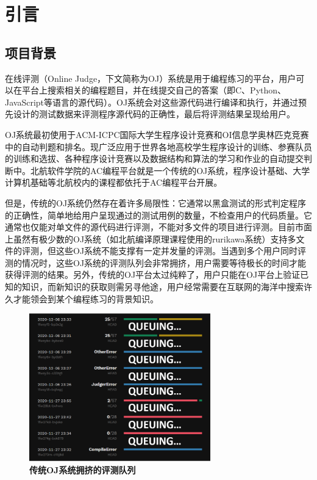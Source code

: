 \chapter{引言}

\section{项目背景}
在线评测（Online Judge，下文简称为OJ）系统是用于编程练习的平台，用户可以在平台上搜索相关的编程题目，并在线提交自己的答案（即C、Python、JavaScript等语言的源代码）。OJ系统会对这些源代码进行编译和执行，并通过预先设计的测试数据来评测程序源代码的正确性，最后将评测结果呈现给用户。

OJ系统最初使用于ACM-ICPC国际大学生程序设计竞赛和OI信息学奥林匹克竞赛中的自动判题和排名。现广泛应用于世界各地高校学生程序设计的训练、参赛队员的训练和选拔、各种程序设计竞赛以及数据结构和算法的学习和作业的自动提交判断中。北航软件学院的AC编程平台就是一个传统的OJ系统，程序设计基础、大学计算机基础等北航校内的课程都依托于AC编程平台开展。

但是，传统的OJ系统仍然存在着许多局限性：它通常以黑盒测试的形式判定程序的正确性，简单地给用户呈现通过的测试用例的数量，不检查用户的代码质量。它通常也仅能对单文件的源代码进行评测，不能对多文件的项目进行评测。目前市面上虽然有极少数的OJ系统（如北航编译原理课程使用的rurikawa系统）支持多文件的评测，但这些OJ系统不能支撑有一定并发量的评测。当遇到多个用户同时评测的情况时，这些OJ系统的评测队列会非常拥挤，用户需要等待极长的时间才能获得评测的结果。另外，传统的OJ平台太过纯粹了，用户只能在OJ平台上验证已知的知识，而新知识的获取则需另寻他途，用户经常需要在互联网的海洋中搜索许久才能领会到某个编程练习的背景知识。

\begin{figure}[H]
    \centering
    \includegraphics[width=0.7\textwidth]{figure/queuing.png}
    \caption{\textbf{传统OJ系统拥挤的评测队列}}
    \label{fig:queuing}
\end{figure}


